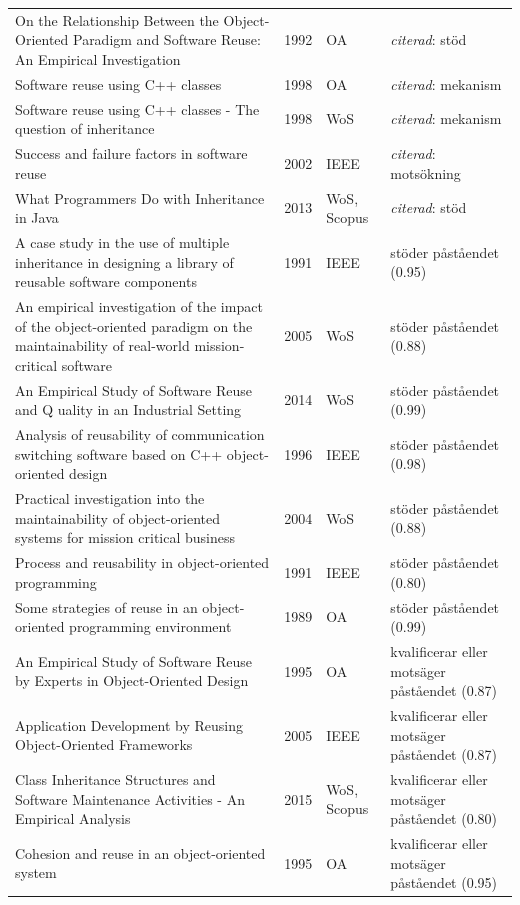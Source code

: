 \begin{longtable}{@{}%
  >{\raggedright\arraybackslash}p{}c%
  >{\raggedright\arraybackslash}p{}%
  >{\raggedright\arraybackslash}p{}@{}}
On the Relationship Between the Object-Oriented Paradigm and Software Reuse: An Empirical Investigation & 1992 & OA & \emph{citerad}: stöd \\
Software reuse using C++ classes & 1998 & OA & \emph{citerad}: mekanism \\
Software reuse using C++ classes - The question of inheritance & 1998 & WoS & \emph{citerad}: mekanism \\
Success and failure factors in software reuse & 2002 & IEEE & \emph{citerad}: motsökning \\
What Programmers Do with Inheritance in Java & 2013 & WoS, Scopus & \emph{citerad}: stöd \\
A case study in the use of multiple inheritance in designing a library of reusable software components & 1991 & IEEE & stöder påståendet (0.95) \\
An empirical investigation of the impact of the object-oriented paradigm on the maintainability of real-world mission-critical software & 2005 & WoS & stöder påståendet (0.88) \\
An Empirical Study of Software Reuse and Q uality in an Industrial Setting & 2014 & WoS & stöder påståendet (0.99) \\
Analysis of reusability of communication switching software based on C++ object-oriented design & 1996 & IEEE & stöder påståendet (0.98) \\
Practical investigation into the maintainability of object-oriented systems for mission critical business & 2004 & WoS & stöder påståendet (0.88) \\
Process and reusability in object-oriented programming & 1991 & IEEE & stöder påståendet (0.80) \\
Some strategies of reuse in an object-oriented programming environment & 1989 & OA & stöder påståendet (0.99) \\
An Empirical Study of Software Reuse by Experts in Object-Oriented Design & 1995 & OA & kvalificerar eller motsäger påståendet (0.87) \\
Application Development by Reusing Object-Oriented Frameworks & 2005 & IEEE & kvalificerar eller motsäger påståendet (0.87) \\
Class Inheritance Structures and Software Maintenance Activities - An Empirical Analysis & 2015 & WoS, Scopus & kvalificerar eller motsäger påståendet (0.80) \\
Cohesion and reuse in an object-oriented system & 1995 & OA & kvalificerar eller motsäger påståendet (0.95) \\

\end{longtable}
